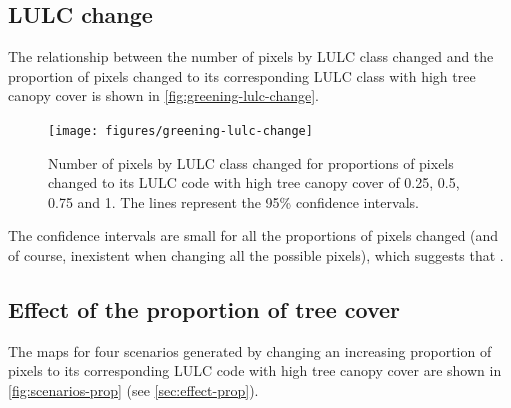 \documentclass[12pt]{iopart}
\begin{document}
\subsection{LULC change}

The relationship between the number of pixels by LULC class changed and the proportion of pixels changed to its corresponding LULC class with high tree canopy cover is shown in \autoref{fig:greening-lulc-change}.

\begin{figure}
  \centering
  \texttt{[image: figures/greening-lulc-change]} 
  \caption{\label{fig:greening-lulc-change} Number of pixels by LULC class changed for proportions of pixels changed to its LULC code with high tree canopy cover of  0.25, 0.5, 0.75 and 1. The lines represent the 95\% confidence intervals.}
\end{figure}

The confidence intervals are small for all the proportions of pixels changed (and of course, inexistent when changing all the possible pixels), which suggests that .


\subsection{Effect of the proportion of tree cover}

The maps for four scenarios generated by changing an increasing proportion of pixels to its corresponding LULC code with high tree canopy cover are shown in \autoref{fig:scenarios-prop} (see \ref{sec:effect-prop}).
\end{document}
